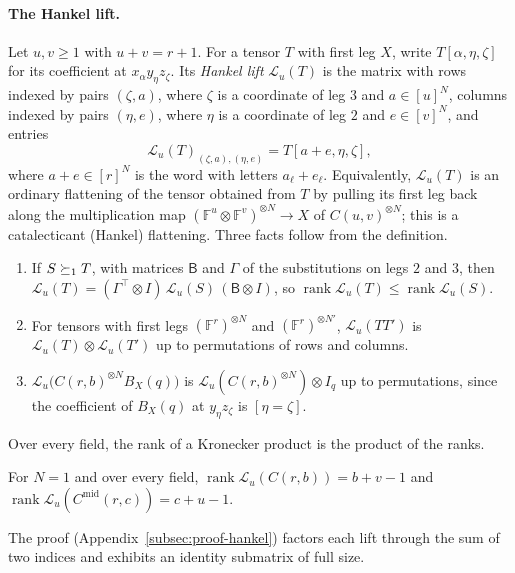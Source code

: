 \paragraph{The Hankel lift.}
Let \(u,v\ge1\) with \(u+v=r+1\). For a tensor \(T\) with first leg
\(X\), write \(T[\alpha,\eta,\zeta]\) for its coefficient at
\(x_\alpha y_\eta z_\zeta\). Its \emph{Hankel lift} \(\mathcal L_u(T)\)
is the matrix with rows indexed by pairs \((\zeta,a)\), where \(\zeta\)
is a coordinate of leg \(3\) and \(a\in[u]^N\), columns indexed by pairs
\((\eta,e)\), where \(\eta\) is a coordinate of leg \(2\) and
\(e\in[v]^N\), and entries
\[
 \mathcal L_u(T)_{(\zeta,a),(\eta,e)}=T[a+e,\eta,\zeta],
\]
where \(a+e\in[r]^N\) is the word with letters \(a_\ell+e_\ell\).
Equivalently, \(\mathcal L_u(T)\) is an ordinary flattening of the
tensor obtained from \(T\) by pulling its first leg back along the
multiplication map \((\mathbb F^u\otimes\mathbb F^v)^{\otimes N}\to X\)
of \(C(u,v)^{\otimes N}\); this is a catalecticant (Hankel) flattening.
Three facts follow from the definition.
\begin{enumerate}
\item[(i)] If \(S\succeq_1T\), with matrices \(\mathsf B\) and
\(\mathsf\Gamma\) of the substitutions on legs \(2\) and \(3\), then
\(\mathcal L_u(T)=(\mathsf\Gamma^{\top}\otimes I)\,\mathcal L_u(S)\,(\mathsf B\otimes I)\),
so \(\operatorname{rank}\mathcal L_u(T)\le\operatorname{rank}\mathcal L_u(S)\).
\item[(ii)] For tensors with first legs \((\mathbb F^r)^{\otimes N}\) and
\((\mathbb F^r)^{\otimes N'}\), \(\mathcal L_u(TT')\) is
\(\mathcal L_u(T)\otimes\mathcal L_u(T')\) up to permutations of rows and
columns.
\item[(iii)] \(\mathcal L_u\bigl(C(r,b)^{\otimes N}B_X(q)\bigr)\) is
\(\mathcal L_u(C(r,b)^{\otimes N})\otimes I_q\) up to permutations, since
the coefficient of \(B_X(q)\) at \(y_\eta z_\zeta\) is \([\eta=\zeta]\).
\end{enumerate}
Over every field, the rank of a Kronecker product is the product of the
ranks.

\begin{lemma}\label{lem:hankel-ranks}
For \(N=1\) and over every field,
\(\operatorname{rank}\mathcal L_u(C(r,b))=b+v-1\) and
\(\operatorname{rank}\mathcal L_u(C^{\mathrm{mid}}(r,c))=c+u-1\).
\end{lemma}

The proof (Appendix~\ref{subsec:proof-hankel}) factors each lift through
the sum of two indices and exhibits an identity submatrix of full size.

